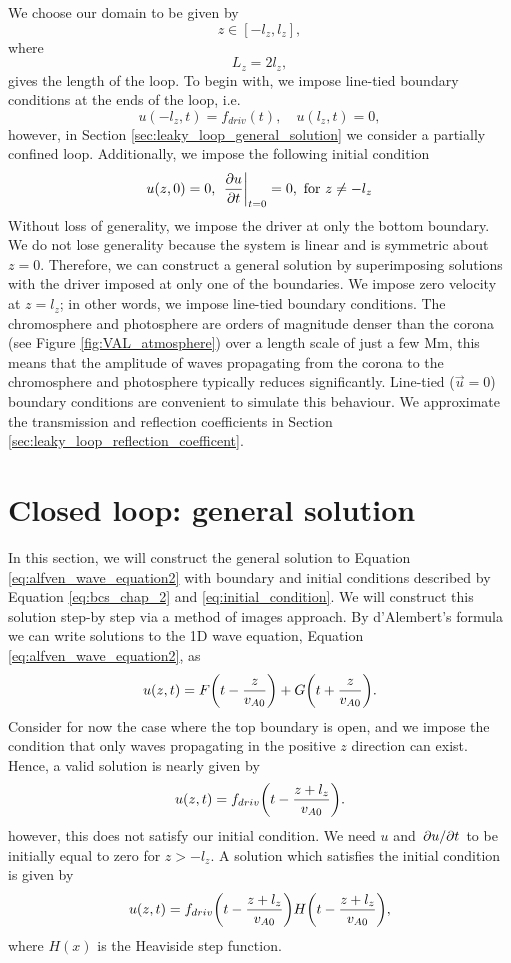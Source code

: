 We choose our domain to be given by
\[z\in[-l_z,l_z],\]
where
\[L_z=2l_z,\]
gives the length of the loop. To begin with, we impose line-tied boundary conditions at the ends of the loop, i.e.
\begin{equation}
    \label{eq:bcs_chap_2}
    u(-l_z,t) = f_{driv}(t),\quad u(l_z,t)=0,
\end{equation}
however, in Section \ref{sec:leaky_loop_general_solution} we consider a partially confined loop. Additionally, we impose the following initial condition
\begin{equation}
    \label{eq:initial_condition}
    u(z,0) = 0,\ \left.\pdv{u}{t}\right|_{t=0} = 0,\ \text{for}\ z\ne-l_z
\end{equation}
Without loss of generality, we impose the driver at only the bottom boundary. We do not lose generality because the system is linear and is symmetric about $z=0$. Therefore, we can construct a general solution by superimposing solutions with the driver imposed at only one of the boundaries. We impose zero velocity at $z=l_z$; in other words, we impose line-tied boundary conditions. The chromosphere and photosphere are orders of magnitude denser than the corona (see Figure \ref{fig:VAL_atmosphere}) over a length scale of just a few Mm, this means that the amplitude of waves propagating from the corona to the chromosphere and photosphere typically reduces significantly. Line-tied ($\vec{u}=0$) boundary conditions are convenient to simulate this behaviour. We approximate the transmission and reflection coefficients in Section \ref{sec:leaky_loop_reflection_coefficent}.

\section{Closed loop: general solution}
\label{sec:chap_2_closed_loop_general_soln}

In this section, we will construct the general solution to Equation \eqref{eq:alfven_wave_equation2} with boundary and initial conditions described by Equation \eqref{eq:bcs_chap_2} and \eqref{eq:initial_condition}. We will construct this solution step-by step via a method of images approach. By d'Alembert's formula we can write solutions to the 1D wave equation, Equation \eqref{eq:alfven_wave_equation2}, as
\begin{equation}
    u(z,t) = F\qty(t - \frac{z}{v_{A0}}) + G\qty(t + \frac{z}{v_{A0}}).
\end{equation}
Consider for now the case where the top boundary is open, and we impose the condition that only waves propagating in the positive $z$ direction can exist. Hence, a valid solution is nearly given by
\[u(z,t) = f_{driv}\qty(t - \frac{z+l_z}{v_{A0}}).\]
however, this does not satisfy our initial condition. We need $u$ and $\pdv*{u}{t}$ to be initially equal to zero for $z>-l_z$. A solution which satisfies the initial condition is given by
\[u(z,t) = f_{driv}\qty(t - \frac{z+l_z}{v_{A0}})H\qty(t - \frac{z+l_z}{v_{A0}}),\]
where $H(x)$ is the Heaviside step function.

